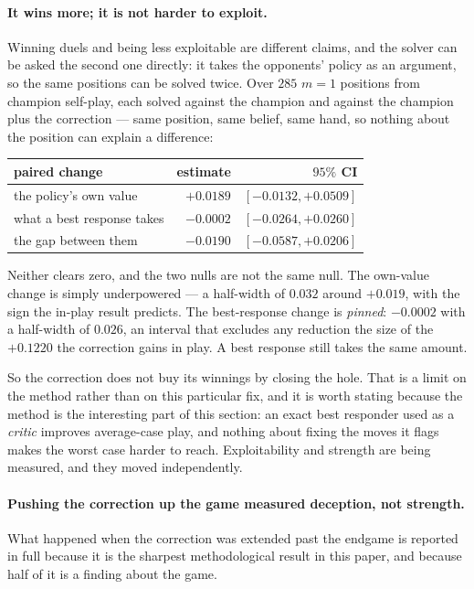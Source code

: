 \documentclass[11pt,a4paper]{article}
\begin{document}
\paragraph{It wins more; it is not harder to exploit.} Winning duels and being
less exploitable are different claims, and the solver can be asked the second
one directly: it takes the opponents' policy as an argument, so the same
positions can be solved twice. Over $285$ $m = 1$ positions from champion
self-play, each solved against the champion and against the champion plus the
correction --- same position, same belief, same hand, so nothing about the
position can explain a difference:

\begin{center}
\begin{tabular}{lrr}
\toprule
paired change & estimate & $95\%$ CI \\
\midrule
the policy's own value & $+0.0189$ & $[-0.0132, +0.0509]$ \\
what a best response takes & $-0.0002$ & $[-0.0264, +0.0260]$ \\
the gap between them & $-0.0190$ & $[-0.0587, +0.0206]$ \\
\bottomrule
\end{tabular}
\end{center}

Neither clears zero, and the two nulls are not the same null. The own-value
change is simply underpowered --- a half-width of $0.032$ around $+0.019$, with
the sign the in-play result predicts. The best-response change is
\emph{pinned}: $-0.0002$ with a half-width of $0.026$, an interval that
excludes any reduction the size of the $+0.1220$ the correction gains in play.
A best response still takes the same amount.

So the correction does not buy its winnings by closing the hole. That is a
limit on the method rather than on this particular fix, and it is worth stating
because the method is the interesting part of this section: an exact best
responder used as a \emph{critic} improves average-case play, and nothing about
fixing the moves it flags makes the worst case harder to reach. Exploitability
and strength are being measured, and they moved independently.

\paragraph{Pushing the correction up the game measured deception, not strength.}
What happened when the correction was extended past the endgame is reported in
full because it is the sharpest methodological result in this paper, and
because half of it is a finding about the game.
\end{document}
